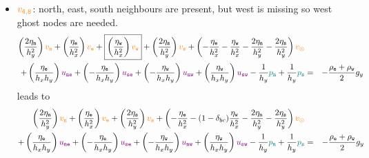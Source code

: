 \begin{itemize}
\item ${\color{orange} v_{\tt 4,8}}$: north, east, south neighbours are present, but west is missing so west ghost nodes are needed.
\begin{eqnarray}
\left( \frac{2\eta_{\tt n}}{h_y^2} \right) {\color{orange} v_{\tt n}} +
\left( \frac{ \eta_{\tt e}}{h_x^2} \right) {\color{orange} v_{\tt e}} +
\boxed{\left( \frac{ \eta_{\tt w}}{h_x^2} \right) {\color{orange} v_{\tt w}}} +
\left( \frac{2\eta_{\tt s}}{h_y^2} \right) {\color{orange} v_{\tt s}} +
\left( 
-\frac{\eta_{\tt e}}{h_x^2} 
-\frac{\eta_{\tt w}}{h_x^2} 
-\frac{2\eta_{\tt n}}{h_y^2} 
-\frac{2\eta_{\tt s}}{h_y^2} 
\right) {\color{orange} v_\otimes} \nonumber\\
+
\left( \frac{\eta_{\tt e}}{h_x h_y} \right) {\color{violet} u_{\tt ne}} +
\left(-\frac{\eta_{\tt e}}{h_x h_y} \right) {\color{violet} u_{\tt se}} +
\left(-\frac{\eta_{\tt w}}{h_x h_y} \right) {\color{violet} u_{\tt nw}} +
\left( \frac{\eta_{\tt w}}{h_x h_y} \right) {\color{violet} u_{\tt sw}} 
-\frac{1}{h_y} {\color{teal}p_{\tt n}} + \frac{1}{h_y} {\color{teal}p_{\tt s}}
&=& -\frac{\rho_{\tt e}+\rho_{\tt w}}{2} g_y \nonumber
\end{eqnarray}
leads to
\begin{eqnarray}
\left( \frac{2\eta_{\tt n}}{h_y^2} \right) {\color{orange} v_{\tt n}} +
\left( \frac{ \eta_{\tt e}}{h_x^2} \right) {\color{orange} v_{\tt e}} +
\left( \frac{2\eta_{\tt s}}{h_y^2} \right) {\color{orange} v_{\tt s}} +
\left( 
-\frac{\eta_{\tt e}}{h_x^2} 
-(1-\delta_{bc})\frac{\eta_{\tt w}}{h_x^2} 
-\frac{2\eta_{\tt n}}{h_y^2} 
-\frac{2\eta_{\tt s}}{h_y^2} 
\right) {\color{orange} v_\otimes} \nonumber\\
+
\left( \frac{\eta_{\tt e}}{h_x h_y} \right) {\color{violet} u_{\tt ne}} +
\left(-\frac{\eta_{\tt e}}{h_x h_y} \right) {\color{violet} u_{\tt se}} +
\left(-\frac{\eta_{\tt w}}{h_x h_y} \right) {\color{violet} u_{\tt nw}} +
\left( \frac{\eta_{\tt w}}{h_x h_y} \right) {\color{violet} u_{\tt sw}} 
-\frac{1}{h_y} {\color{teal}p_{\tt n}} + \frac{1}{h_y} {\color{teal}p_{\tt s}}
&=& -\frac{\rho_{\tt e}+\rho_{\tt w}}{2} g_y \nonumber
\end{eqnarray}




\end{itemize}
